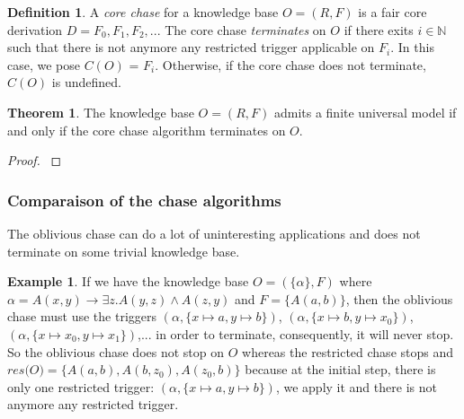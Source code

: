 \documentclass{article}
\theoremstyle{definition}
\newtheorem{definition}{Definition}[section]
\newtheorem{theorem}{Theorem}[section]
\newtheorem{example}{Example}[section]
\theoremstyle{remark}
\def \N {\mathbb N}
\begin{document}
\begin{definition}
A \emph{core chase} for a knowledge base $O= (R,F)$ is a fair core derivation $D=F_0,F_1,F_2,...$ The core chase \emph{terminates} on $O$ if there exits $i \in \N$ such that there is not anymore any restricted trigger applicable on $F_i$. In this case, we pose \emph{$\textit{C}(O)$} = $F_i$.
Otherwise, if the core chase does not terminate,$\textit{C}(O)$ is undefined.
\end{definition}

\begin{theorem}
The knowledge base $O = (R,F)$ admits a finite universal model if and only if the core chase algorithm terminates on $O$.
\end{theorem}

\begin{proof}
\cite{core_chase}
\end{proof}

\subsubsection{Comparaison of the chase algorithms}

The oblivious chase  can do a lot of uninteresting applications and does not terminate on some trivial knowledge base. 
\begin{example}
If we have the knowledge base $O=(\{\alpha\},F)$ where $\alpha = A(x,y) \rightarrow \exists z.A(y,z) \wedge A(z,y)$ and $F =  \{A(a,b)\}$, then the oblivious chase must use the triggers $(\alpha, \{x \mapsto a, y \mapsto b\})$, $(\alpha, \{x \mapsto b, y \mapsto x_0\})$,$(\alpha, \{x \mapsto x_0, y \mapsto x_1\})$,... in order to terminate, consequently, it will never stop. So the oblivious chase does not stop on $O$ whereas the restricted chase stops and $\textit{res(O)} = \{A(a,b),A(b,z_0),A(z_0,b)\}$ because at the initial step, there is only one restricted trigger: $(\alpha, \{x \mapsto a, y \mapsto b\})$, we apply it and there is not anymore any restricted trigger.
\end{example}
\end{document}
